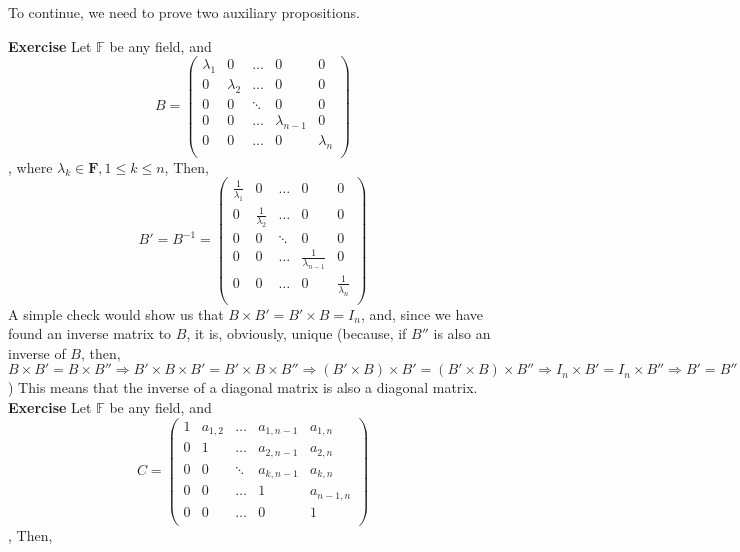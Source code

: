 \documentclass[12pt]{article}
\begin{document}
To continue, we need to prove two auxiliary propositions. \newline

\textbf{Exercise} \newline
Let $\mathbb{F}$ be any field, and $$
B=\begin{pmatrix} 
	\lambda_1 & 0 & \dots & 0 & 0 \\
	0 & \lambda_2 & \dots & 0 & 0 \\
	0 & 0 & \ddots & 0 & 0 \\
	0 & 0 & \dots & \lambda_{n-1} & 0 \\
	0 & 0 & \dots & 0 & \lambda_n \\
	\end{pmatrix}
	\quad
$$, 
where $\lambda_k \in \mathbf{F},1 \leq k \leq n$, Then, \newline
$$
B'=B^{-1}=\begin{pmatrix} 
	\frac{1}{\lambda_1} & 0 & \dots & 0 & 0 \\
	0 & \frac{1}{\lambda_2} & \dots & 0 & 0 \\
	0 & 0 & \ddots & 0 & 0 \\
	0 & 0 & \dots & \frac{1}{\lambda_{n-1}} & 0 \\
	0 & 0 & \dots & 0 & \frac{1}{\lambda_n} \\
	\end{pmatrix}
	\quad
$$
A simple check would show us that $B \times B'=B' \times B=I_n$, and, since we have found an inverse matrix to $B$, it is, obviously, unique \newline (because, if $B''$ is also an inverse of $B$, then, $B \times B'=B \times B'' \Rightarrow B' \times B \times B'=B' \times B \times B'' \Rightarrow (B' \times B) \times B'=(B' \times B) \times B'' \Rightarrow I_n \times B'=I_n \times B'' \Rightarrow B'=B''$) \newline
This means that the inverse of a diagonal matrix is also a diagonal matrix. \newline
\newline
\textbf{Exercise} \newline
Let $\mathbb{F}$ be any field, and $$
C=\begin{pmatrix} 
	1 & a_{1,2} & \dots & a_{1,n-1} & a_{1,n} \\
	0 & 1 & \dots & a_{2,n-1} & a_{2,n} \\
	0 & 0 & \ddots & a_{k,n-1} & a_{k,n} \\
	0 & 0 & \dots & 1 & a_{n-1,n} \\
	0 & 0 & \dots & 0 & 1 \\
	\end{pmatrix}
	\quad
 $$, Then, \newline
\end{document}
